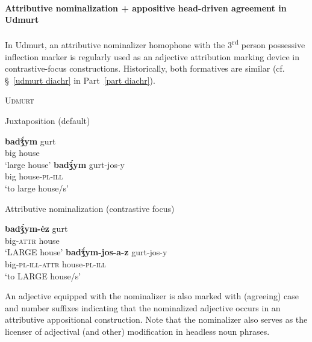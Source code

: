 \paragraph{Attributive nominalization + appositive head-driven agreement in Udmurt} \label{udmurt synchr}
In Udmurt, an attributive nominalizer homophone with the 3\textsuperscript{rd} person possessive inflection marker is regularly used as an adjective attribution marking device in contrastive-focus constructions. Historically, both formatives are similar (cf. \S~\ref{udmurt diachr} in Part~\ref{part diachr}).
\begin{exe}
\ex \textsc{Udmurt} \citep{winkler2001}
\begin{xlist}
\ex	Juxtaposition (default)
\begin{xlist}
\ex
\gll	\textbf{badǯ́ym} gurt\\
	big house\\
\glt	‘large house’
\ex	
\gll	\textbf{badǯ́ym} gurt-jos-y\\
	big house-\textsc{pl}-\textsc{ill}\\
\glt	‘to large house/s’
\end{xlist}
\ex	Attributive nominalization (contrastive focus)
\begin{xlist}
\ex
\gll	\textbf{badǯ́ym-ėz} gurt\\
	big-\textsc{attr} house\\
\glt	‘LARGE house’
\ex	
\gll	\textbf{badǯ́ym-jos-a-z} gurt-jos-y\\
	big-\textsc{pl}-\textsc{ill}-\textsc{attr} house-\textsc{pl}-\textsc{ill}\\
\glt	‘to LARGE house/s’
\end{xlist}
\end{xlist}
\end{exe}
An adjective equipped with the nominalizer is also marked with (agreeing) case and number suffixes indicating that the nominalized adjective occurs in an attributive appositional construction. Note that the nominalizer also serves as the licenser of adjectival (and other) modification in headless noun phrases.
